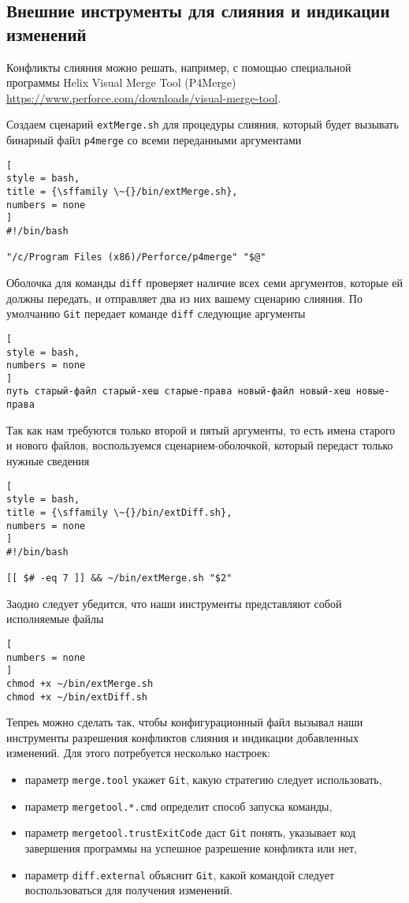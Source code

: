 \documentclass[%
	11pt,
	a4paper,
	utf8,
		]{article}
\begin{document}
\subsection{Внешние инструменты для слияния и индикации изменений}

Конфликты слияния можно решать, например, с помощью специальной программы Helix Visual Merge Tool (P4Merge) \url{https://www.perforce.com/downloads/visual-merge-tool}.

Создаем сценарий \texttt{extMerge.sh} для процедуры слияния, который будет вызывать бинарный файл \texttt{p4merge} со всеми переданными аргументами
\begin{lstlisting}[
style = bash,
title = {\sffamily \~{}/bin/extMerge.sh},
numbers = none
]
#!/bin/bash

"/c/Program Files (x86)/Perforce/p4merge" "$@"
\end{lstlisting}

Оболочка для команды \texttt{diff} проверяет наличие всех семи аргументов, которые ей должны передать, и отправляет два из них вашему сценарию слияния. По умолчанию \texttt{Git} передает команде \texttt{diff} следующие аргументы
\begin{lstlisting}[
style = bash,
numbers = none
]
путь старый-файл старый-хеш старые-права новый-файл новый-хеш новые-права
\end{lstlisting}

Так как нам требуются только второй и пятый аргументы, то есть имена старого и нового файлов, воспользуемся сценарием-оболочкой, который передаст только нужные сведения
\begin{lstlisting}[
style = bash,
title = {\sffamily \~{}/bin/extDiff.sh},
numbers = none
]
#!/bin/bash

[[ $# -eq 7 ]] && ~/bin/extMerge.sh "$2" 
\end{lstlisting}

Заодно следует убедится, что наши инструменты представляют собой исполняемые файлы
\begin{lstlisting}[
numbers = none
]
chmod +x ~/bin/extMerge.sh
chmod +x ~/bin/extDiff.sh
\end{lstlisting}

Тепреь можно сделать так, чтобы конфигурационный файл вызывал наши инструменты разрешения конфликтов слияния и индикации добавленных изменений. Для этого потребуется несколько настроек:
\begin{itemize}
	\item параметр \verb|merge.tool| укажет \texttt{Git}, какую стратегию следует использовать,
	
	\item параметр \verb|mergetool.*.cmd| определит способ запуска команды,
	
	\item параметр \verb|mergetool.trustExitCode| даст \texttt{Git} понять, указывает код завершения программы на успешное разрешение конфликта или нет, 
	
	\item параметр \texttt{diff.external} объяснит \texttt{Git}, какой командой  следует воспользоваться для получения изменений.
\end{itemize}
\end{document}
